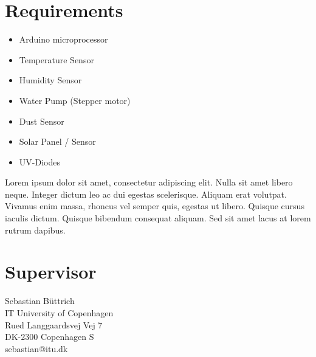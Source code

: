 \documentclass{ubicomp2012}
\begin{document}
\section{Requirements}
\begin{itemize}
\item Arduino microprocessor
\item Temperature Sensor
\item Humidity Sensor
\item Water Pump (Stepper motor)
\item Dust Sensor
\item Solar Panel / Sensor
\item UV-Diodes 
\end{itemize}

Lorem ipsum dolor sit amet, consectetur adipiscing elit. Nulla sit amet libero neque. Integer dictum leo ac dui egestas scelerisque. Aliquam erat volutpat. Vivamus enim massa, rhoncus vel semper quis, egestas ut libero. Quisque cursus iaculis dictum. Quisque bibendum consequat aliquam. Sed sit amet lacus at lorem rutrum dapibus.

\section{Supervisor}
Sebastian B\"uttrich\\
IT University of Copenhagen\\
Rued Langgaardsvej Vej 7\\
DK-2300 Copenhagen S\\
sebastian@itu.dk

\nocite{example-journal,example-abstracts,example-conference2}



\end{document}
